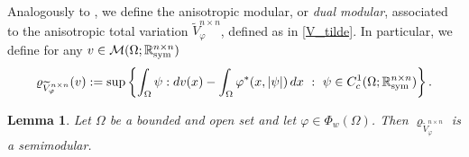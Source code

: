 \documentclass[a4paper,11pt,oneside,notitlepage]{article}
\newtheorem{lemma}[theorem]{Lemma}
\numberwithin{equation}{section}
\def\R{\mathbb{R}}
\def\M{\mathcal{M}}
\def\sym{{\rm sym}}
\newcommand{\vphi}{\varphi}
\newcommand{\vrho}{\varrho}
\newcommand{\st}{ \ : \ }
\begin{document}
Analogously to \cite[Definition 4.1]{EHH}, we define the anisotropic modular, or {\it dual modular}, associated to the anisotropic total variation $\widetilde{V}^{n \times n}_\vphi$, defined as in \eqref{V_tilde}. In particular, we define for any $v \in \M(\Omega; \R^{n \times n}_\sym)$
\begin{equation}
\label{varrhosymvarphi}
    \vrho_{\widetilde{V}^{n \times n}_\vphi}(v) := \sup \left\{ \int_\Omega \psi : dv(x) - \int_\Omega\vphi^*(x,|\psi|) \, dx \st \psi \in C^1_c(\Omega; \R^{n \times n}_\sym) \right\}.
\end{equation}

\begin{lemma}
\label{lmm:semimod}
    Let $\Omega$ be a bounded and open set and let $\vphi \in \Phi_w(\Omega)$. Then $\vrho_{\widetilde{V}^{n \times n}_\vphi}$ is a semimodular.
\end{lemma}
\end{document}
